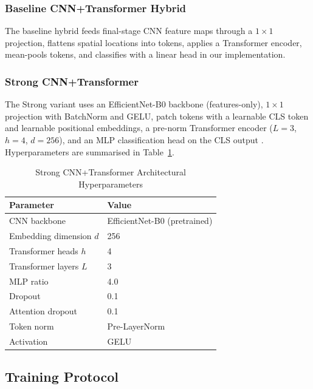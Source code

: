 \documentclass[10pt,journal,compsoc]{IEEEtran}
\begin{document}
\subsubsection{Baseline CNN+Transformer Hybrid}
The baseline hybrid feeds final-stage CNN feature maps through a
$1 \times 1$ projection, flattens spatial locations into tokens, applies
a Transformer encoder, mean-pools tokens, and classifies with a linear
head in our implementation.

\subsubsection{Strong CNN+Transformer}
\label{subsubsec:strong}
The Strong variant uses an EfficientNet-B0 backbone (features-only),
$1 \times 1$ projection with BatchNorm and GELU, patch tokens with a
learnable CLS token and learnable positional embeddings, a pre-norm
Transformer encoder ($L{=}3$, $h{=}4$, $d{=}256$), and an MLP classification
head on the CLS output \cite{rw2019timm}. Hyperparameters are summarised
in Table~\ref{tab:strong_config}.

\begin{table}[h]
  \caption{Strong CNN+Transformer Architectural Hyperparameters}
  \label{tab:strong_config}
  \centering
  \begin{tabular}{ll}
    \toprule
    \textbf{Parameter}        & \textbf{Value} \\
    \midrule
    CNN backbone              & EfficientNet-B0 (pretrained) \\
    Embedding dimension $d$   & 256 \\
    Transformer heads $h$     & 4 \\
    Transformer layers $L$    & 3 \\
    MLP ratio                 & 4.0 \\
    Dropout                   & 0.1 \\
    Attention dropout         & 0.1 \\
    Token norm                & Pre-LayerNorm \\
    Activation                & GELU \\
    \bottomrule
  \end{tabular}
\end{table}

\subsection{Training Protocol}
\label{subsec:training}
\end{document}
